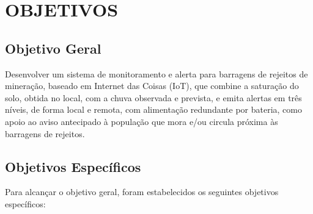 \chapter{OBJETIVOS}
\label{cap:objetivos}

\section{Objetivo Geral}
\label{sec:objetivo-geral}

Desenvolver um sistema de monitoramento e alerta para barragens de
rejeitos de mineração, baseado em Internet das Coisas (IoT), que
combine a saturação do solo, obtida no local, com a chuva observada e
prevista, e emita alertas em três níveis, de forma local e remota, com
alimentação redundante por bateria, como apoio ao aviso antecipado à
população que mora e/ou circula próxima às barragens de rejeitos.

\section{Objetivos Específicos}
\label{sec:objetivos-especificos}

Para alcançar o objetivo geral, foram estabelecidos os seguintes
objetivos específicos:

